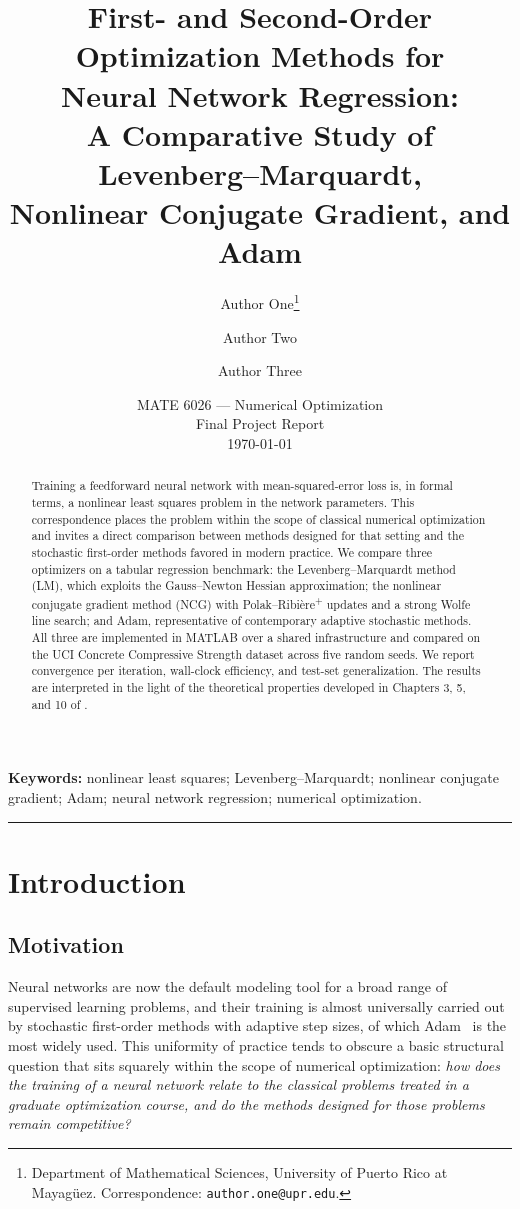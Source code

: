 \documentclass[11pt,letterpaper]{article}
\title{%
  \Large
  First- and Second-Order Optimization Methods for\\
  Neural Network Regression:\\
  A Comparative Study of Levenberg--Marquardt,\\
  Nonlinear Conjugate Gradient, and Adam
}
\author{%
  Author One\thanks{Department of Mathematical Sciences, University of Puerto Rico at Mayagüez. Correspondence: \texttt{author.one@upr.edu}.} \and
  Author Two\footnotemark[1] \and
  Author Three\footnotemark[1]
}
\date{MATE 6026 --- Numerical Optimization \\ Final Project Report \\ \today}
\theoremstyle{definition}
\begin{document}
 
\maketitle
 
\begin{abstract}
\noindent
Training a feedforward neural network with mean-squared-error loss is, in formal
terms, a nonlinear least squares problem in the network parameters. This
correspondence places the problem within the scope of classical numerical
optimization and invites a direct comparison between methods designed for
that setting and the stochastic first-order methods favored in modern practice.
We compare three optimizers on a tabular regression benchmark: the
Levenberg--Marquardt method (LM), which exploits the Gauss--Newton Hessian
approximation; the nonlinear conjugate gradient method (NCG) with
Polak--Ribière\textsuperscript{+} updates and a strong Wolfe line search; and
Adam, representative of contemporary adaptive stochastic methods. All three
are implemented in MATLAB over a shared infrastructure and compared on the
UCI Concrete Compressive Strength dataset across five random seeds. We report
convergence per iteration, wall-clock efficiency, and test-set generalization.
The results are interpreted in the light of the theoretical properties
developed in Chapters 3, 5, and 10 of \citet{NocedalWright2006}.
\end{abstract}
 
\bigskip
\noindent
\textbf{Keywords:} nonlinear least squares; Levenberg--Marquardt; nonlinear
conjugate gradient; Adam; neural network regression; numerical optimization.
 
\vspace{1em}
\hrule
 
\section{Introduction}
\label{sec:introduction}
 
\subsection{Motivation}
 
Neural networks are now the default modeling tool for a broad range of
supervised learning problems, and their training is almost universally
carried out by stochastic first-order methods with adaptive step sizes, of
which Adam~\citep{KingmaBa2015} is the most widely used. This uniformity of
practice tends to obscure a basic structural question that sits squarely
within the scope of numerical optimization: \emph{how does the training of a
neural network relate to the classical problems treated in a graduate
optimization course, and do the methods designed for those problems remain
competitive?}
 
\end{document}

